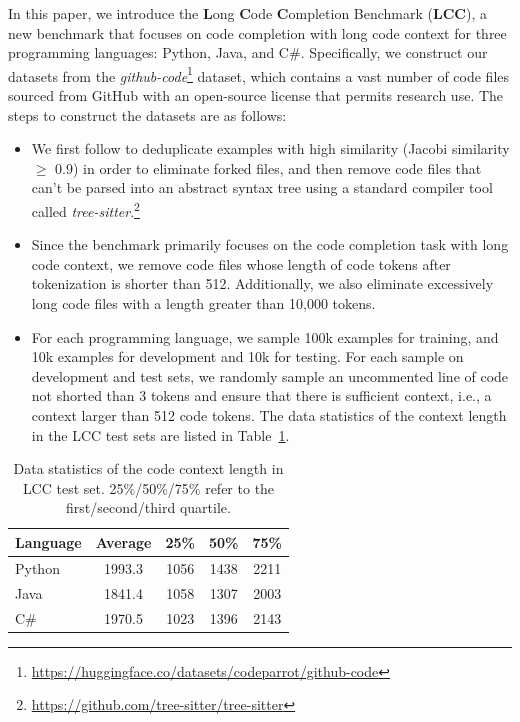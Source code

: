 \documentclass{article}
\begin{document}
In this paper, we introduce the \textbf{L}ong \textbf{C}ode \textbf{C}ompletion Benchmark (\textbf{LCC}), a new benchmark that focuses on code completion with long code context for three programming languages: Python, Java, and C\#. Specifically, we construct our datasets from the \textit{github-code}\footnote{\url{https://huggingface.co/datasets/codeparrot/github-code}} dataset, which contains a vast number of code files sourced from GitHub with an open-source license that permits research use. The steps to construct the datasets are as follows:
\begin{itemize}
\item We first follow \citet{allamanis2019adverse} to deduplicate examples with high similarity (Jacobi similarity $\ge$ 0.9) in order to eliminate forked files, and then remove code files that can't be parsed into an abstract syntax tree using a standard compiler tool called \textit{tree-sitter}.\footnote{\url{https://github.com/tree-sitter/tree-sitter}}

\item Since the benchmark primarily focuses on the code completion task with long code context, we remove code files whose length of code tokens after tokenization is shorter than 512. Additionally, we also eliminate excessively long code files with a length greater than 10,000 tokens.

\item For each programming language, we sample 100k examples for training, and 10k examples for development and 10k for testing.
For each sample on development and test sets, we randomly sample an uncommented line of code not shorted than 3 tokens and ensure that there is sufficient context, i.e., a context larger than 512 code tokens. The data statistics of the context length in the LCC test sets are listed in Table~\ref{LCC-sta}. 
\end{itemize}
 \begin{table}[t]
\caption{Data statistics of the code context length in LCC test set. 25\%/50\%/75\% refer to the first/second/third quartile.}
\label{LCC-sta}
\begin{center}
\begin{tabular}{lcccc}
    \toprule
    Language&Average &25\% &50\% &75\% \\
    \midrule
    Python &1993.3& 1056& 1438& 2211\\
    Java  &1841.4& 1058& 1307& 2003\\
    C\#  &1970.5& 1023& 1396& 2143\\
    \bottomrule
\end{tabular}
\end{center}
\end{table}
\end{document}
